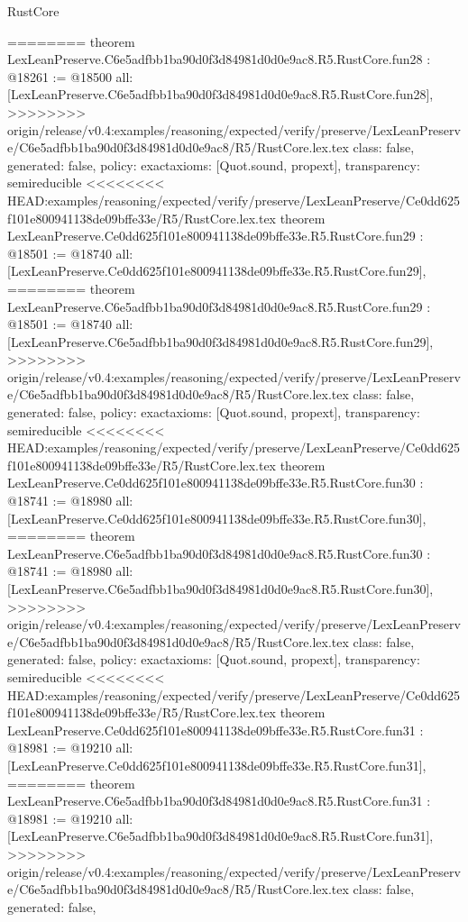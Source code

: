 \begin{lexlean}{RustCore}
\begin{coremodule}
{\begin{coremodule}
{{{{{{{{{{{{{{{{{{{{{{{{{{{{{{{========
theorem LexLeanPreserve.C6e5adfbb1ba90d0f3d84981d0d0e9ac8.R5.RustCore.fun28 : @18261 := @18500 {
  all: [LexLeanPreserve.C6e5adfbb1ba90d0f3d84981d0d0e9ac8.R5.RustCore.fun28],
>>>>>>>> origin/release/v0.4:examples/reasoning/expected/verify/preserve/LexLeanPreserve/C6e5adfbb1ba90d0f3d84981d0d0e9ac8/R5/RustCore.lex.tex
  class: false,
  generated: false,
  policy: exact{axioms: [Quot.sound, propext]},
  transparency: semireducible
}
<<<<<<<< HEAD:examples/reasoning/expected/verify/preserve/LexLeanPreserve/Ce0dd625f101e800941138de09bffe33e/R5/RustCore.lex.tex
theorem LexLeanPreserve.Ce0dd625f101e800941138de09bffe33e.R5.RustCore.fun29 : @18501 := @18740 {
  all: [LexLeanPreserve.Ce0dd625f101e800941138de09bffe33e.R5.RustCore.fun29],
========
theorem LexLeanPreserve.C6e5adfbb1ba90d0f3d84981d0d0e9ac8.R5.RustCore.fun29 : @18501 := @18740 {
  all: [LexLeanPreserve.C6e5adfbb1ba90d0f3d84981d0d0e9ac8.R5.RustCore.fun29],
>>>>>>>> origin/release/v0.4:examples/reasoning/expected/verify/preserve/LexLeanPreserve/C6e5adfbb1ba90d0f3d84981d0d0e9ac8/R5/RustCore.lex.tex
  class: false,
  generated: false,
  policy: exact{axioms: [Quot.sound, propext]},
  transparency: semireducible
}
<<<<<<<< HEAD:examples/reasoning/expected/verify/preserve/LexLeanPreserve/Ce0dd625f101e800941138de09bffe33e/R5/RustCore.lex.tex
theorem LexLeanPreserve.Ce0dd625f101e800941138de09bffe33e.R5.RustCore.fun30 : @18741 := @18980 {
  all: [LexLeanPreserve.Ce0dd625f101e800941138de09bffe33e.R5.RustCore.fun30],
========
theorem LexLeanPreserve.C6e5adfbb1ba90d0f3d84981d0d0e9ac8.R5.RustCore.fun30 : @18741 := @18980 {
  all: [LexLeanPreserve.C6e5adfbb1ba90d0f3d84981d0d0e9ac8.R5.RustCore.fun30],
>>>>>>>> origin/release/v0.4:examples/reasoning/expected/verify/preserve/LexLeanPreserve/C6e5adfbb1ba90d0f3d84981d0d0e9ac8/R5/RustCore.lex.tex
  class: false,
  generated: false,
  policy: exact{axioms: [Quot.sound, propext]},
  transparency: semireducible
}
<<<<<<<< HEAD:examples/reasoning/expected/verify/preserve/LexLeanPreserve/Ce0dd625f101e800941138de09bffe33e/R5/RustCore.lex.tex
theorem LexLeanPreserve.Ce0dd625f101e800941138de09bffe33e.R5.RustCore.fun31 : @18981 := @19210 {
  all: [LexLeanPreserve.Ce0dd625f101e800941138de09bffe33e.R5.RustCore.fun31],
========
theorem LexLeanPreserve.C6e5adfbb1ba90d0f3d84981d0d0e9ac8.R5.RustCore.fun31 : @18981 := @19210 {
  all: [LexLeanPreserve.C6e5adfbb1ba90d0f3d84981d0d0e9ac8.R5.RustCore.fun31],
>>>>>>>> origin/release/v0.4:examples/reasoning/expected/verify/preserve/LexLeanPreserve/C6e5adfbb1ba90d0f3d84981d0d0e9ac8/R5/RustCore.lex.tex
  class: false,
  generated: false,
}}}}}}}}}}}}}}}}}}}}}}}}}}}}}}}}}}}
\end{coremodule}}
\end{coremodule}
\end{lexlean}

